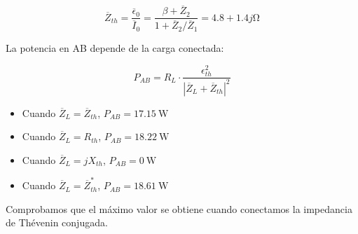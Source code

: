 \begin{equation*}
  \overline{Z}_{th} = \frac{\overline{\epsilon}_0}{\overline{I}_0} = \frac{\beta + \overline{Z}_2}{1 + \overline{Z}_2/\overline{Z}_1} = 4.8 + 1.4j\si{\ohm}
\end{equation*}

La potencia en AB depende de la carga conectada:

\begin{equation*}
  P_{AB} = R_L \cdot \frac{\epsilon_{th}^2}{|\overline{Z}_L + \overline{Z}_{th}|^2}
\end{equation*}

\begin{itemize}
\item Cuando $\overline{Z}_L = \overline{Z}_{th}$, $P_{AB} = \SI{17.15}{\watt}$
\item Cuando $\overline{Z}_L = R_{th}$, $P_{AB} = \SI{18.22}{\watt}$
\item Cuando $\overline{Z}_L = jX_{th}$, $P_{AB} = \SI{0}{\watt}$
\item Cuando $\overline{Z}_L = \overline{Z}^*_{th}$, $P_{AB} = \SI{18.61}{\watt}$
\end{itemize}

Comprobamos que el máximo valor se obtiene cuando conectamos la impedancia de Thévenin conjugada.



